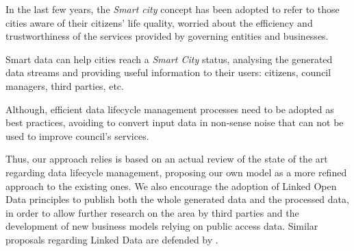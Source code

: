 In the last few years, the \textit{Smart city} concept has been adopted to refer to those cities aware of their citizens' life quality, worried about the efficiency and trustworthiness of the services provided by governing entities and businesses.

Smart data can help cities reach a \textit{Smart City} status, analysing the generated data streams and providing useful information to their users: citizens, council managers, third parties, etc.

Although, efficient data lifecycle management processes need to be adopted as best practices, avoiding to convert input data in non-sense noise that can not be used to improve council's services.

Thus, our approach relies is based on an actual review of the state of the art regarding data lifecycle management, proposing our own model as a more refined approach to the existing ones. We also encourage the adoption of Linked Open Data principles to publish both the whole generated data and the processed data, in order to allow further research on the area by third parties and the development of new business models relying on public access data. Similar proposals regarding Linked Data are defended by \cite{Bizer:2012:MUB:2094114.2094129}.
